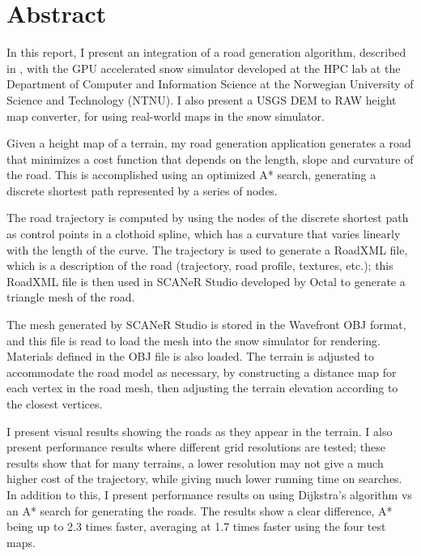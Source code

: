 \chapter*{Abstract}

In this report, I present an integration of a road generation algorithm, described in \cite{roadgen}, with the GPU accelerated snow simulator developed at the HPC lab at the Department of Computer and Information Science at the Norwegian University of Science and Technology (NTNU). I also present a USGS DEM to RAW height map converter, for using real-world maps in the snow simulator. 

Given a height map of a terrain, my road generation application generates a road that minimizes a cost function that depends on the length, slope and curvature of the road. This is accomplished using an optimized A* search, generating a discrete shortest path represented by a series of nodes. 

The road trajectory is computed by using the nodes of the discrete shortest path as control points in a clothoid spline, which has a curvature that varies linearly with the length of the curve. The trajectory is used to generate a RoadXML file, which is a description of the road (trajectory, road profile, textures, etc.); this RoadXML file is then used in SCANeR Studio developed by Octal\cite{octalstudio} to generate a triangle mesh of the road. 

The mesh generated by SCANeR Studio is stored in the Wavefront OBJ format, and this file is read to load the mesh into the snow simulator for rendering. Materials defined in the OBJ file is also loaded. The terrain is adjusted to accommodate the road model as necessary, by constructing a distance map for each vertex in the road mesh, then adjusting the terrain elevation according to the closest vertices.

I present visual results showing the roads as they appear in the terrain. I also present performance results where different grid resolutions are tested; these results show that for many terrains, a lower resolution may not give a much higher cost of the trajectory, while giving much lower running time on searches. In addition to this, I present performance results on using Dijkstra's algorithm vs an A* search for generating the roads. The results show a clear difference, A* being up to 2.3 times faster, averaging at 1.7 times faster using the four test maps.

